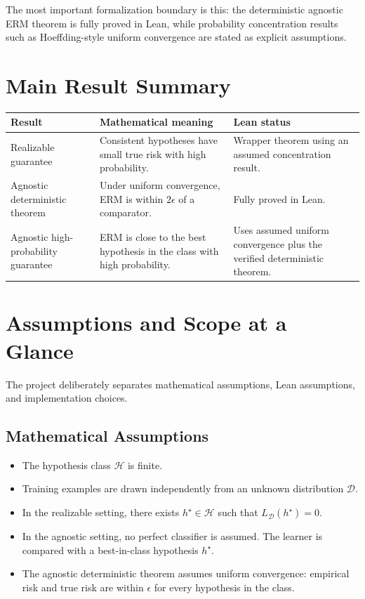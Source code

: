 \documentclass[11pt]{article}
\newcommand{\Hclass}{\mathcal{H}}
\newcommand{\Ddist}{\mathcal{D}}
\newcommand{\LD}{L_{\Ddist}}
\newcommand{\hstar}{h^\star}
\newcommand{\eps}{\epsilon}
\theoremstyle{definition}
\begin{document}
The most important formalization boundary is this: the deterministic agnostic
ERM theorem is fully proved in Lean, while probability concentration results
such as Hoeffding-style uniform convergence are stated as explicit assumptions.

\section{Main Result Summary}

\begin{center}
\begin{tabular}{p{}p{}p{}}
\toprule
\textbf{Result} & \textbf{Mathematical meaning} & \textbf{Lean status} \\
\midrule
Realizable guarantee
& Consistent hypotheses have small true risk with high probability.
& Wrapper theorem using an assumed concentration result. \\
\addlinespace
Agnostic deterministic theorem
& Under uniform convergence, ERM is within $2\eps$ of a comparator.
& Fully proved in Lean. \\
\addlinespace
Agnostic high-probability guarantee
& ERM is close to the best hypothesis in the class with high probability.
& Uses assumed uniform convergence plus the verified deterministic theorem. \\
\bottomrule
\end{tabular}
\end{center}

\section{Assumptions and Scope at a Glance}

The project deliberately separates mathematical assumptions, Lean assumptions,
and implementation choices.

\subsection{Mathematical Assumptions}

\begin{itemize}[leftmargin=*]
  \item The hypothesis class $\Hclass$ is finite.
  \item Training examples are drawn independently from an unknown distribution
  $\Ddist$.
  \item In the realizable setting, there exists $\hstar\in\Hclass$ such that
  $\LD(\hstar)=0$.
  \item In the agnostic setting, no perfect classifier is assumed. The learner is
  compared with a best-in-class hypothesis $\hstar$.
  \item The agnostic deterministic theorem assumes uniform convergence: empirical
  risk and true risk are within $\eps$ for every hypothesis in the class.
\end{itemize}
\end{document}
